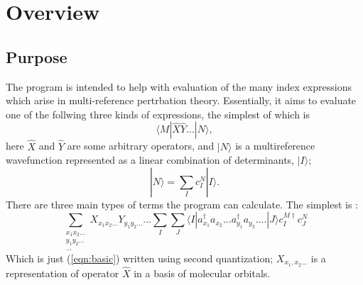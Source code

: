 \documentclass[12pt]{article}
\begin{document}
\section {Overview}
\subsection{Purpose}
The program is intended to help with evaluation of the many index expressions which arise in multi-reference pertrbation theory. 
Essentially, it aims to evaluate one of the follwing three kinds of expressions, the simplest of which is
\begin{equation}
\langle M | \hat{X} \hat{Y} ... | N \rangle,
\label{eqn:basic}
\end{equation}
\noindent here $\hat{X}$ and $\hat{Y}$ are some arbitrary operators, and $| N \rangle$  is a multireference wavefunction represented as a linear combination of determinants, $|I\rangle $;
\begin{equation}
|N\rangle = \sum_{I} c_{I}^{N}| I \rangle.
\end{equation} 
\noindent There are three main types of terms the program can calculate. The simplest is :
\begin{equation}
\sum_{\substack{ x_{1}x_{2}...\\ y_{1}y_{2}... \\ ...}} X_{x_{1}x_{2}...} Y_{y_{1}y_{2}...} ...
\sum_{I}\sum_{J}
\langle I | a^{\dagger}_{x_{1}} a_{x_{2}}...a^{\dagger}_{y_{1}}a_{y_{2}}....| J \rangle 
 c^{M \dagger}_{I}c^{N}_{J}
\label{eqn:basic_2nd_quantized}
\end{equation}
\noindent  Which is just (\ref{eqn:basic}) written using second quantization; $X_{x_{1},x_{2}...}$ is a representation of operator
$\hat{X}$ in a basis of molecular orbitals. \\
\end{document}
